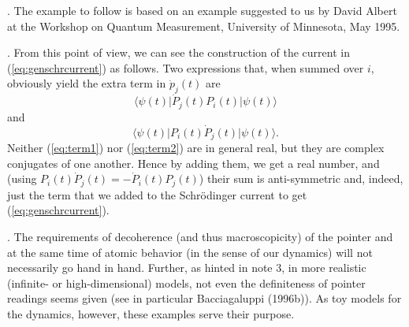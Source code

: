 \documentclass[12pt]{article}
\newcommand{\be}{\begin{equation}}
\newcommand{\ee}{\end{equation}}
\newcommand{\bra}[1]{\langle #1\vert}                           %
\newcommand{\ket}[1]{\vert #1\rangle}                           %
\begin{document}
\vspace*{12pt}

.  The example to follow is based on an example suggested to
us by David Albert at the Workshop on Quantum Measurement, University 
of Minnesota, May 1995.

\vspace*{12pt}

. From this point of view, we can see the construction of the
current in (\ref{eq:genschrcurrent}) as follows.  Two expressions 
that, when summed over $i$, obviously yield the extra term in 
$\dot{p}_j(t)$ are
\be
  \label{eq:term1}
  \bra{\psi(t)} \dot{P}_j(t) P_i(t) \ket{\psi(t)}
\ee
and
\be
  \label{eq:term2}
  \bra{\psi(t)} P_i(t) \dot{P}_j(t) \ket{\psi(t)}.
\ee
\noindent Neither (\ref{eq:term1}) nor (\ref{eq:term2}) are in general real,
but they are complex conjugates of one another.  Hence by adding them, 
we get a real number, and (using $P_i(t)\dot{P}_j(t) = - \dot{P}_i(t) 
P_j(t)$) their sum is anti-symmetric and, indeed, just the term that 
we added to the Schr\"odinger current to get 
(\ref{eq:genschrcurrent}).

\vspace*{12pt}

. The requirements of decoherence (and thus macroscopicity) of
the pointer and at the same time of atomic behavior (in the sense of 
our dynamics) will not necessarily go hand in hand.  Further, as 
hinted in note 3, in more realistic (infinite- or high-dimensional) 
models, not even the definiteness of pointer readings seems given (see 
in particular Bacciagaluppi (1996b)).  As toy models for the dynamics, 
however, these examples serve their purpose.
\end{document}
